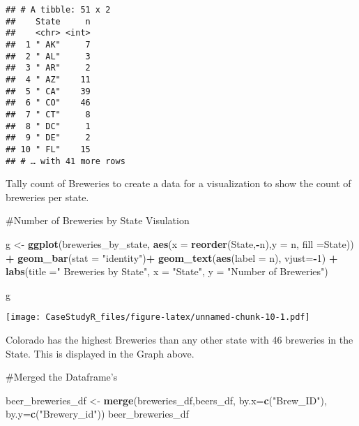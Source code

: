 \documentclass[
]{article}
\newenvironment{Shaded}{\begin{snugshade}}{\end{snugshade}}
\newcommand{\DataTypeTok}[1]{\textcolor[rgb]{0.13,0.29,0.53}{#1}}
\newcommand{\DecValTok}[1]{\textcolor[rgb]{0.00,0.00,0.81}{#1}}
\newcommand{\KeywordTok}[1]{\textcolor[rgb]{0.13,0.29,0.53}{\textbf{#1}}}
\newcommand{\NormalTok}[1]{#1}
\newcommand{\OperatorTok}[1]{\textcolor[rgb]{0.81,0.36,0.00}{\textbf{#1}}}
\newcommand{\StringTok}[1]{\textcolor[rgb]{0.31,0.60,0.02}{#1}}
\begin{document}
\begin{verbatim}
## # A tibble: 51 x 2
##    State     n
##    <chr> <int>
##  1 " AK"     7
##  2 " AL"     3
##  3 " AR"     2
##  4 " AZ"    11
##  5 " CA"    39
##  6 " CO"    46
##  7 " CT"     8
##  8 " DC"     1
##  9 " DE"     2
## 10 " FL"    15
## # … with 41 more rows
\end{verbatim}

Tally count of Breweries to create a data for a visualization to show
the count of breweries per state.

\#Number of Breweries by State Visulation

\begin{Shaded}
\begin{Highlighting}[]
\NormalTok{g <-}\StringTok{ }\KeywordTok{ggplot}\NormalTok{(breweries_by_state, }\KeywordTok{aes}\NormalTok{(}\DataTypeTok{x =} \KeywordTok{reorder}\NormalTok{(State,}\OperatorTok{-}\NormalTok{n),}\DataTypeTok{y =}\NormalTok{ n, }\DataTypeTok{fill =}\NormalTok{State)) }\OperatorTok{+}\StringTok{ }\KeywordTok{geom_bar}\NormalTok{(}\DataTypeTok{stat =} \StringTok{"identity"}\NormalTok{)}\OperatorTok{+}\StringTok{ }\KeywordTok{geom_text}\NormalTok{(}\KeywordTok{aes}\NormalTok{(}\DataTypeTok{label =}\NormalTok{ n), }\DataTypeTok{vjust=}\OperatorTok{-}\DecValTok{1}\NormalTok{) }\OperatorTok{+}\StringTok{ }\KeywordTok{labs}\NormalTok{(}\DataTypeTok{title =}\StringTok{" Breweries by State"}\NormalTok{, }\DataTypeTok{x =} \StringTok{"State"}\NormalTok{, }\DataTypeTok{y =} \StringTok{"Number of Breweries"}\NormalTok{)}

\NormalTok{g}
\end{Highlighting}
\end{Shaded}

\texttt{[image: CaseStudyR\_files/figure-latex/unnamed-chunk-10-1.pdf]}

Colorado has the highest Breweries than any other state with 46
breweries in the State. This is displayed in the Graph above.

\#Merged the Dataframe's

\begin{Shaded}
\begin{Highlighting}[]
\NormalTok{beer_breweries_df <-}\StringTok{ }\KeywordTok{merge}\NormalTok{(breweries_df,beers_df, }\DataTypeTok{by.x=}\KeywordTok{c}\NormalTok{(}\StringTok{"Brew_ID"}\NormalTok{), }\DataTypeTok{by.y=}\KeywordTok{c}\NormalTok{(}\StringTok{"Brewery_id"}\NormalTok{))}
\NormalTok{beer_breweries_df}
\end{Highlighting}
\end{Shaded}
\end{document}
